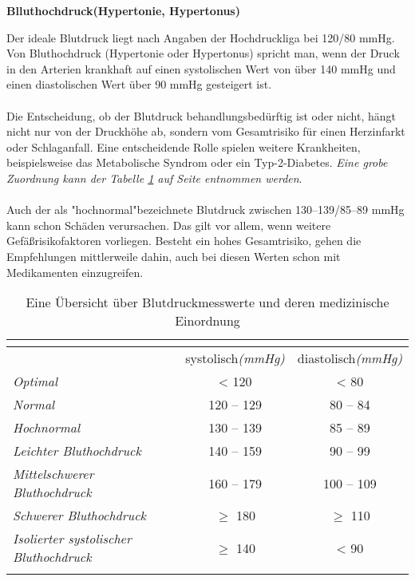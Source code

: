 \documentclass{scrartcl}
\begin{document}
{\bfseries Blluthochdruck(Hypertonie, Hypertonus)}\par\bigskip
Der ideale Blutdruck liegt nach Angaben der Hochdruckliga bei 120/80 mmHg. Von
Bluthochdruck (Hypertonie oder Hypertonus) spricht man, wenn der Druck in den Arterien
krankhaft auf einen systolischen Wert von über 140 mmHg und einen diastolischen
Wert über 90 mmHg gesteigert ist.\\ \\
Die Entscheidung, ob der Blutdruck behandlungsbedürftig ist oder nicht, hängt nicht nur
von der Druckhöhe ab, sondern vom Gesamtrisiko für einen Herzinfarkt oder Schlaganfall.
Eine entscheidende Rolle spielen weitere Krankheiten, beispielsweise das Metabolische
Syndrom oder ein Typ-2-Diabetes. {\itshape Eine grobe Zuordnung kann der Tabelle \ref{table:Tabelle 1} auf
Seite \pageref{table:Tabelle 1} entnommen werden}.\\ \\
Auch der als "hochnormal"bezeichnete Blutdruck zwischen 130–139/85–89 mmHg kann
schon Schäden verursachen. Das gilt vor allem, wenn weitere Gefäßrisikofaktoren vorliegen.
Besteht ein hohes Gesamtrisiko, gehen die Empfehlungen mittlerweile dahin, auch
bei diesen Werten schon mit Medikamenten einzugreifen.

\begin{table}[!htb]
\centering
\begin{tabular}{|>{\itshape}l c c|}\firsthline
\multicolumn{3}{|>{\bfseries}c|}{Blutrucktabelle}\\\hline\hline
 & systolisch{\itshape(mmHg)} & diastolisch{\itshape(mmHg)}\\
 Optimal & < 120 & < 80\\
Normal & 120 – 129 & 80 – 84\\
Hochnormal & 130 – 139 & 85 – 89\\
Leichter Bluthochdruck & 140 – 159 & 90 – 99\\
Mittelschwerer Bluthochdruck & 160 – 179 & 100 – 109\\
Schwerer Bluthochdruck & $\geq$ 180 & $\geq$ 110\\
Isolierter systolischer Bluthochdruck & $\geq$ 140 & < 90\\\lasthline
\end{tabular}
\caption{Eine Übersicht über Blutdruckmesswerte und deren medizinische Einordnung}
\label{table:Tabelle 1}


\end{table}
\end{document}
